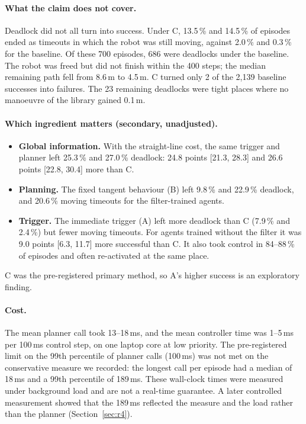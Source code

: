 \documentclass[11pt]{article}
\theoremstyle{definition}
\theoremstyle{remark}
\begin{document}
\paragraph{What the claim does not cover.} Deadlock did not all turn into success. Under C, 13.5\,\% and 14.5\,\% of episodes ended as timeouts in which the robot was still moving, against 2.0\,\% and 0.3\,\% for the baseline. Of these 700 episodes, 686 were deadlocks under the baseline. The robot was freed but did not finish within the 400 steps; the median remaining path fell from 8.6\,m to 4.5\,m. C turned only 2 of the 2{,}139 baseline successes into failures. The 23 remaining deadlocks were tight places where no manoeuvre of the library gained 0.1\,m.

\paragraph{Which ingredient matters (secondary, unadjusted).}
\begin{itemize}
  \item \textbf{Global information.} With the straight-line cost, the same trigger and planner left 25.3\,\% and 27.0\,\% deadlock: 24.8 points [21.3, 28.3] and 26.6 points [22.8, 30.4] more than C.
  \item \textbf{Planning.} The fixed tangent behaviour (B) left 9.8\,\% and 22.9\,\% deadlock, and 20.6\,\% moving timeouts for the filter-trained agents.
  \item \textbf{Trigger.} The immediate trigger (A) left more deadlock than C (7.9\,\% and 2.4\,\%) but fewer moving timeouts. For agents trained without the filter it was 9.0 points [6.3, 11.7] more successful than C. It also took control in 84--88\,\% of episodes and often re-activated at the same place.
\end{itemize}
C was the pre-registered primary method, so A's higher success is an exploratory finding.

\paragraph{Cost.} The mean planner call took 13--18\,ms, and the mean controller time was 1--5\,ms per 100\,ms control step, on one laptop core at low priority. The pre-registered limit on the 99th percentile of planner calls (100\,ms) was not met on the conservative measure we recorded: the longest call per episode had a median of 18\,ms and a 99th percentile of 189\,ms. These wall-clock times were measured under background load and are not a real-time guarantee. A later controlled measurement showed that the 189\,ms reflected the measure and the load rather than the planner (Section~\ref{sec:r4}).
\end{document}
